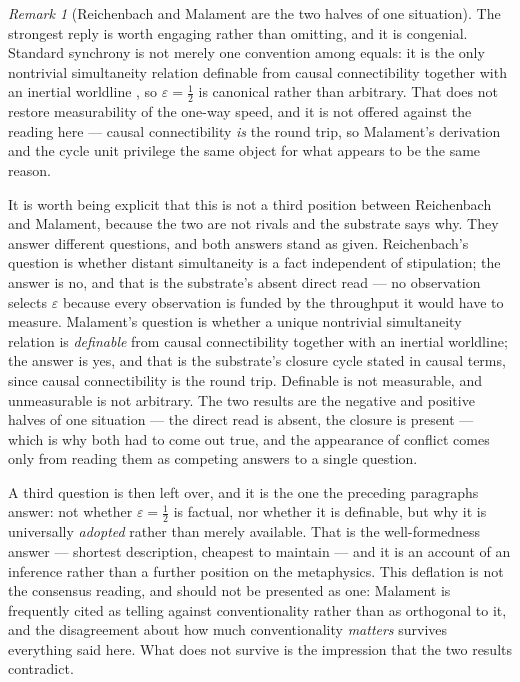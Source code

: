 \documentclass[11pt,a4paper]{article}
\theoremstyle{remark}\newtheorem{remark}[definition]{Remark}
\begin{document}
\begin{remark}[Reichenbach and Malament are the two halves of one situation]\label{rem:reichenbach-malament}
The strongest reply is worth engaging rather than omitting, and it is congenial. Standard synchrony
is not merely one convention among equals: it is the only nontrivial simultaneity relation definable
from causal connectibility together with an inertial worldline \citep{malament1977}, so
$\varepsilon=\tfrac12$ is canonical rather than arbitrary. That does not restore measurability of the
one-way speed, and it is not offered against the reading here --- causal connectibility \emph{is} the
round trip, so Malament's derivation and the cycle unit privilege the same object for what appears to
be the same reason.

It is worth being explicit that this is not a third position between Reichenbach
and Malament, because the two are not rivals and the substrate says why. They answer different
questions, and both answers stand as given. Reichenbach's question is whether distant simultaneity is
a fact independent of stipulation; the answer is no, and that is the substrate's absent direct
read --- no observation selects $\varepsilon$ because every observation is funded by the throughput
it would have to measure. Malament's question is whether a unique nontrivial simultaneity relation is
\emph{definable} from causal connectibility together with an inertial worldline; the answer is yes,
and that is the substrate's closure cycle stated in causal terms, since causal connectibility is the
round trip. Definable is not measurable, and unmeasurable is not arbitrary. The two results are the
negative and positive halves of one situation --- the direct read is absent, the closure is
present --- which is why both had to come out true, and the appearance of conflict comes only from
reading them as competing answers to a single question.

A third question is then left over, and it is the one the preceding paragraphs answer: not whether
$\varepsilon=\tfrac12$ is factual, nor whether it is definable, but why it is universally
\emph{adopted} rather than merely available. That is the well-formedness answer --- shortest
description, cheapest to maintain --- and it is an account of an inference rather than a further
position on the metaphysics. This deflation is not the consensus reading, and should not be presented
as one: Malament is frequently cited as telling against conventionality rather than as orthogonal to
it, and the disagreement about how much conventionality \emph{matters} survives everything said here.
What does not survive is the impression that the two results contradict.
\end{remark}
\end{document}
